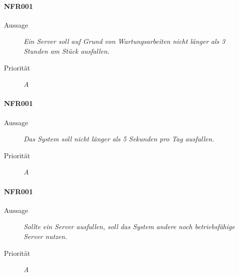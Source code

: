 \paragraph{NFR001}
\begin{description}
  \item[Aussage] \textit{Ein Server soll auf Grund von Wartungsarbeiten nicht l\"anger als 3 Stunden am St\"uck ausfallen.}
  \item[Priorit\"at] \textit{A}
\end{description}


\paragraph{NFR001}
\begin{description}
  \item[Aussage] \textit{Das System soll nicht l\"anger als 5 Sekunden pro Tag ausfallen.}
  \item[Priorit\"at] \textit{A}
\end{description}

\paragraph{NFR001}
\begin{description}
  \item[Aussage] \textit{Sollte ein Server ausfallen, soll das System andere noch betriebsf\"ahige Server nutzen.}
  \item[Priorit\"at] \textit{A}
\end{description}